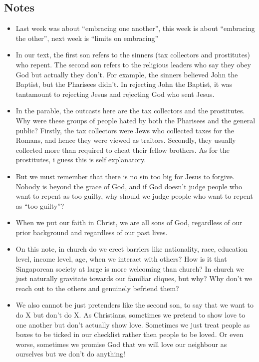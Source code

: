 \subsection*{Notes}
\begin{itemize}
  \item{Last week was about “embracing one another”, this week is about “embracing the other”, next week is “limits on embracing”}
  \item{In our text, the first son refers to the sinners (tax collectors and prostitutes) who repent. The second son refers to the religious leaders who say they obey God but actually they don’t. For example, the sinners believed John the Baptist, but the Pharisees didn’t. In rejecting John the Baptist, it was tantamount to rejecting Jesus and rejecting God who sent Jesus.}
  \item{In the parable, the outcasts here are the tax collectors and the prostitutes. Why were these groups of people hated by both the Pharisees and the general public? Firstly, the tax collectors were Jews who collected taxes for the Romans, and hence they were viewed as traitors. Secondly, they usually collected more than required to cheat their fellow brothers. As for the prostitutes, i guess this is self explanatory. }
  \item{But we must remember that there is no sin too big for Jesus to forgive. Nobody is beyond the grace of God, and if God doesn’t judge people who want to repent as too guilty, why should we judge people who want to repent as “too guilty”?}
  \item{When we put our faith in Christ, we are all sons of God, regardless of our prior background and regardless of our past lives.}
  \item{On this note, in church do we erect barriers like nationality, race, education level, income level, age, when we interact with others? How is it that Singaporean society at large is more welcoming than church? In church we just naturally gravitate towards our familiar cliques, but why? Why don’t we reach out to the others and genuinely befriend them?}
  \item{We also cannot be just pretenders like the second son, to say that we want to do X but don’t do X. As Christians, sometimes we pretend to show love to one another but don’t actually show love. Sometimes we just treat people as boxes to be ticked in our checklist rather then people to be loved. Or even worse, sometimes we promise God that we will love our neighbour as ourselves but we don’t do anything!}
\end{itemize}